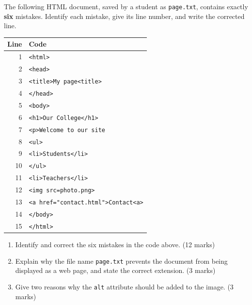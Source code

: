 \documentclass[11pt]{article}
\begin{document}
\begin{exercice}
The following HTML document, saved by a student as \texttt{page.txt}, contains exactly \textbf{six} mistakes. Identify each mistake, give its line number, and write the corrected line.
\begin{center}
\begin{tabular}{|r|l|}
\hline
\rowcolor{popblueL} \textbf{Line} & \textbf{Code} \\
\hline
1 & \texttt{<html>} \\
2 & \texttt{<head>} \\
3 & \texttt{<title>My page<title>} \\
4 & \texttt{</head>} \\
5 & \texttt{<body>} \\
6 & \texttt{<h1>Our College</h1>} \\
7 & \texttt{<p>Welcome to our site} \\
8 & \texttt{<ul>} \\
9 & \texttt{<li>Students</li>} \\
10 & \texttt{</ul>} \\
11 & \texttt{<li>Teachers</li>} \\
12 & \texttt{<img src=photo.png>} \\
13 & \texttt{<a href="contact.html">Contact<a>} \\
14 & \texttt{</body>} \\
15 & \texttt{</html>} \\
\hline
\end{tabular}
\end{center}
\begin{enumerate}
\item Identify and correct the six mistakes in the code above. \hfill (12 marks)
\item Explain why the file name \texttt{page.txt} prevents the document from being displayed as a web page, and state the correct extension. \hfill (3 marks)
\item Give two reasons why the \texttt{alt} attribute should be added to the image. \hfill (3 marks)
\end{enumerate}
\end{exercice}
\end{document}
